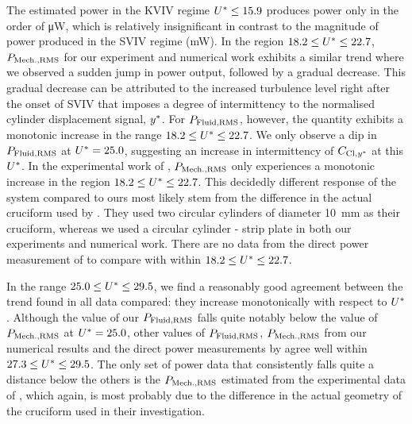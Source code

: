\documentclass[a4paper,fleqn]{cas-sc}
\begin{document}
The estimated power in the KVIV regime $U^{*} \leq 15.9$ produces power only in the order of \si{\micro\watt}, which is relatively insignificant in contrast to the magnitude of power produced in the SVIV regime (mW). In the region $18.2 \leq U^{*} \leq 22.7$, $P_{\text{Mech.,RMS}}$ for our experiment and numerical work exhibits a similar trend where we observed a sudden jump in power output, followed by a gradual decrease. This gradual decrease can be attributed to the increased turbulence level right after the onset of SVIV that imposes a degree of intermittency to the normalised cylinder displacement signal, $y^{*}$. For $P_{\text{Fluid,RMS}}$, however, the quantity exhibits a monotonic increase in the range $18.2 \leq U^{*} \leq 22.7$. We only observe a dip in $P_{\text{Fluid,RMS}}$ at $U^{*} = 25.0$, suggesting an increase in intermittency of $C_{\text{Cl},y^{*}}$ at this $U^{*}$. In the experimental work of \citet{Nguyen2012}, $P_{\text{Mech.,RMS}}$ only experiences a monotonic increase in the region $18.2 \leq U^{*} \leq 22.7$. This decidedly different response of the system compared to ours most likely stem from the difference in the actual cruciform used by \citet{Nguyen2012}. They used two circular cylinders of diameter \SI{10}{\milli\metre} as their cruciform, whereas we used a circular cylinder - strip plate in both our experiments and numerical work. There are no data from the direct power measurement of \citet{Koide2013} to compare with within $18.2 \leq U^{*} \leq 22.7$.

In the range $25.0 \leq U^{*} \leq 29.5$, we find a reasonably good agreement between the trend found in all data compared: they increase monotonically with respect to $U^{*}$. Although the value of our $P_{\text{Fluid,RMS}}$ falls quite notably below the value of $P_{\text{Mech.,RMS}}$ at $U^{*} = 25.0$, other values of $P_{\text{Fluid,RMS}}$, $P_{\text{Mech.,RMS}}$ from our numerical results and the direct power measurements by \citet{Koide2013} agree well within $27.3 \leq U^{*} \leq 29.5$. The only set of power data that consistently falls quite a distance below the others is the $P_{\text{Mech.,RMS}}$ estimated from the experimental data of \citet{Nguyen2012}, which again, is most probably due to the difference in the actual geometry of the cruciform used in their investigation.
\end{document}
